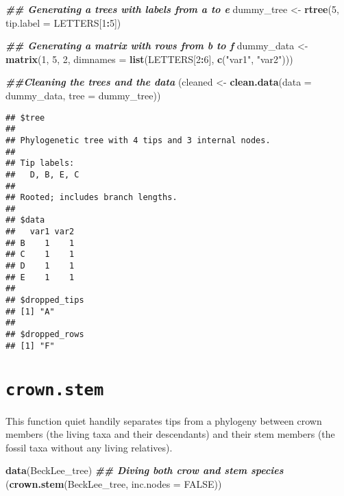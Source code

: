 \documentclass[
]{book}
\newenvironment{Shaded}{\begin{snugshade}}{\end{snugshade}}
\newcommand{\AttributeTok}[1]{\textcolor[rgb]{0.13,0.29,0.53}{#1}}
\newcommand{\ConstantTok}[1]{\textcolor[rgb]{0.56,0.35,0.01}{#1}}
\newcommand{\DecValTok}[1]{\textcolor[rgb]{0.00,0.00,0.81}{#1}}
\newcommand{\DocumentationTok}[1]{\textcolor[rgb]{0.56,0.35,0.01}{\textbf{\textit{#1}}}}
\newcommand{\FunctionTok}[1]{\textcolor[rgb]{0.13,0.29,0.53}{\textbf{#1}}}
\newcommand{\NormalTok}[1]{#1}
\newcommand{\OtherTok}[1]{\textcolor[rgb]{0.56,0.35,0.01}{#1}}
\newcommand{\SpecialCharTok}[1]{\textcolor[rgb]{0.81,0.36,0.00}{\textbf{#1}}}
\newcommand{\StringTok}[1]{\textcolor[rgb]{0.31,0.60,0.02}{#1}}
\begin{document}
\begin{Shaded}
\begin{Highlighting}[]
\DocumentationTok{\#\# Generating a trees with labels from a to e}
\NormalTok{dummy\_tree }\OtherTok{\textless{}{-}} \FunctionTok{rtree}\NormalTok{(}\DecValTok{5}\NormalTok{, }\AttributeTok{tip.label =}\NormalTok{ LETTERS[}\DecValTok{1}\SpecialCharTok{:}\DecValTok{5}\NormalTok{])}

\DocumentationTok{\#\# Generating a matrix with rows from b to f}
\NormalTok{dummy\_data }\OtherTok{\textless{}{-}} \FunctionTok{matrix}\NormalTok{(}\DecValTok{1}\NormalTok{, }\DecValTok{5}\NormalTok{, }\DecValTok{2}\NormalTok{, }\AttributeTok{dimnames =} \FunctionTok{list}\NormalTok{(LETTERS[}\DecValTok{2}\SpecialCharTok{:}\DecValTok{6}\NormalTok{], }\FunctionTok{c}\NormalTok{(}\StringTok{"var1"}\NormalTok{, }\StringTok{"var2"}\NormalTok{)))}

\DocumentationTok{\#\#Cleaning the trees and the data}
\NormalTok{(cleaned }\OtherTok{\textless{}{-}} \FunctionTok{clean.data}\NormalTok{(}\AttributeTok{data =}\NormalTok{ dummy\_data, }\AttributeTok{tree =}\NormalTok{ dummy\_tree))}
\end{Highlighting}
\end{Shaded}

\begin{verbatim}
## $tree
## 
## Phylogenetic tree with 4 tips and 3 internal nodes.
## 
## Tip labels:
##   D, B, E, C
## 
## Rooted; includes branch lengths.
## 
## $data
##   var1 var2
## B    1    1
## C    1    1
## D    1    1
## E    1    1
## 
## $dropped_tips
## [1] "A"
## 
## $dropped_rows
## [1] "F"
\end{verbatim}

\hypertarget{crown.stem}{%
\section{\texorpdfstring{\texttt{crown.stem}}{crown.stem}}\label{crown.stem}}

This function quiet handily separates tips from a phylogeny between crown members (the living taxa and their descendants) and their stem members (the fossil taxa without any living relatives).

\begin{Shaded}
\begin{Highlighting}[]
\FunctionTok{data}\NormalTok{(BeckLee\_tree)}
\DocumentationTok{\#\# Diving both crow and stem species}
\NormalTok{(}\FunctionTok{crown.stem}\NormalTok{(BeckLee\_tree, }\AttributeTok{inc.nodes =} \ConstantTok{FALSE}\NormalTok{))}
\end{Highlighting}
\end{Shaded}
\end{document}
